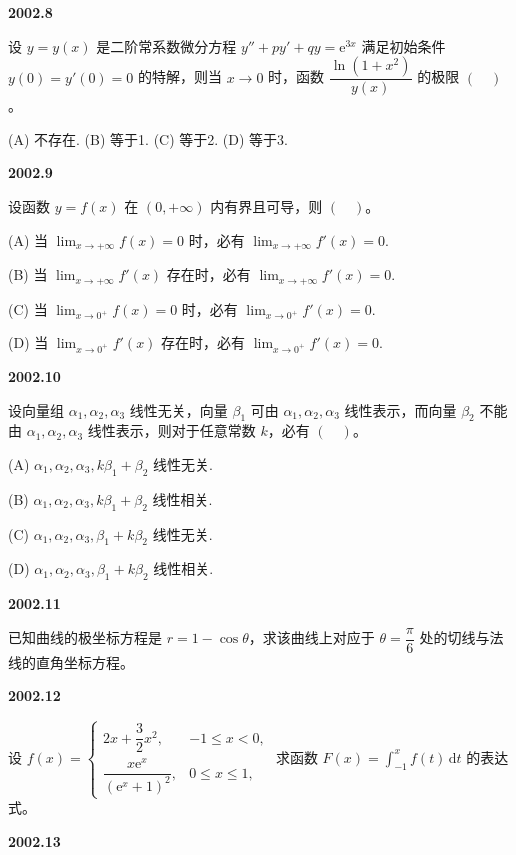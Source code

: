 \documentclass[UTF8,12pt,fontset=windows]{ctexart}
\begin{document}
\vfill
\newpage
{\large\bfseries 2002.8}

设 $y=y(x)$ 是二阶常系数微分方程 $y''+py'+qy=\mathrm{e}^{3x}$ 满足初始条件 $y(0)=y'(0)=0$ 的特解，则当 $x\to0$ 时，函数 $\dfrac{\ln(1+x^2)}{y(x)}$ 的极限 $(\quad)$。

(A) 不存在.  (B) 等于1.  (C) 等于2.  (D) 等于3.

\vfill
\newpage
{\large\bfseries 2002.9}

设函数 $y=f(x)$ 在 $(0,+\infty)$ 内有界且可导，则 $(\quad)$。

(A) 当 $\lim_{x\to+\infty}f(x)=0$ 时，必有 $\lim_{x\to+\infty}f'(x)=0$.

(B) 当 $\lim_{x\to+\infty}f'(x)$ 存在时，必有 $\lim_{x\to+\infty}f'(x)=0$.

(C) 当 $\lim_{x\to0^+}f(x)=0$ 时，必有 $\lim_{x\to0^+}f'(x)=0$.

(D) 当 $\lim_{x\to0^+}f'(x)$ 存在时，必有 $\lim_{x\to0^+}f'(x)=0$.

\vfill
\newpage
{\large\bfseries 2002.10}

设向量组 $\alpha_1,\alpha_2,\alpha_3$ 线性无关，向量 $\beta_1$ 可由 $\alpha_1,\alpha_2,\alpha_3$ 线性表示，而向量 $\beta_2$ 不能由 $\alpha_1,\alpha_2,\alpha_3$ 线性表示，则对于任意常数 $k$，必有 $(\quad)$。

(A) $\alpha_1,\alpha_2,\alpha_3,k\beta_1+\beta_2$ 线性无关.

(B) $\alpha_1,\alpha_2,\alpha_3,k\beta_1+\beta_2$ 线性相关.

(C) $\alpha_1,\alpha_2,\alpha_3,\beta_1+k\beta_2$ 线性无关.

(D) $\alpha_1,\alpha_2,\alpha_3,\beta_1+k\beta_2$ 线性相关.

\vfill
\newpage
{\large\bfseries 2002.11}

已知曲线的极坐标方程是 $r=1-\cos\theta$，求该曲线上对应于 $\theta=\dfrac{\pi}{6}$ 处的切线与法线的直角坐标方程。

\vfill
\newpage
{\large\bfseries 2002.12}

设 $f(x)=\begin{cases}2x+\dfrac{3}{2}x^2, & -1\le x<0,\\[4pt] \dfrac{x\mathrm{e}^x}{(\mathrm{e}^x+1)^2}, & 0\le x\le1,\end{cases}$ 求函数 $F(x)=\int_{-1}^x f(t)\,\mathrm{d}t$ 的表达式。

\vfill
\newpage
{\large\bfseries 2002.13}
\end{document}
